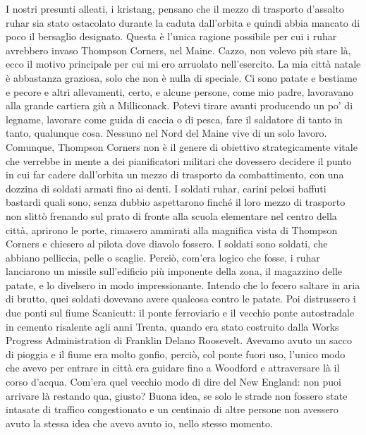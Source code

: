 I nostri presunti alleati, i kristang, pensano che il mezzo di trasporto
d'assalto ruhar sia stato ostacolato durante la caduta dall'orbita e
quindi abbia mancato di poco il bersaglio designato. Questa è l'unica
ragione possibile per cui i ruhar avrebbero invaso Thompson Corners, nel
Maine. Cazzo, non volevo più stare là, ecco il motivo principale per cui
mi ero arruolato nell'esercito. La mia città natale è abbastanza
graziosa, solo che non è nulla di speciale. Ci sono patate e bestiame e
pecore e altri allevamenti, certo, e alcune persone, come mio padre,
lavoravano alla grande cartiera giù a Milliconack. Potevi tirare avanti
producendo un po' di legname, lavorare come guida di caccia o di pesca,
fare il saldatore di tanto in tanto, qualunque cosa. Nessuno nel Nord
del Maine vive di un solo lavoro. Comunque, Thompson Corners non è il
genere di obiettivo strategicamente vitale che verrebbe in mente a dei
pianificatori militari che dovessero decidere il punto in cui far cadere
dall'orbita un mezzo di trasporto da combattimento, con una dozzina di
soldati armati fino ai denti. I soldati ruhar, carini pelosi baffuti
bastardi quali sono, senza dubbio aspettarono finché il loro mezzo di
trasporto non slittò frenando sul prato di fronte alla scuola elementare
nel centro della città, aprirono le porte, rimasero ammirati alla
magnifica vista di Thompson Corners e chiesero al pilota dove diavolo
fossero. I soldati sono soldati, che abbiano pelliccia, pelle o scaglie.
Perciò, com'era logico che fosse, i ruhar lanciarono un missile
sull'edificio più imponente della zona, il magazzino delle patate, e lo
divelsero in modo impressionante. Intendo che lo fecero saltare in aria
di brutto, quei soldati dovevano avere qualcosa contro le patate. Poi
distrussero i due ponti sul fiume Scanicutt: il ponte ferroviario e il
vecchio ponte autostradale in cemento risalente agli anni Trenta, quando
era stato costruito dalla Works Progress Administration di Franklin
Delano Roosevelt. Avevamo avuto un sacco di pioggia e il fiume era molto
gonfio, perciò, col ponte fuori uso, l'unico modo che avevo per entrare
in città era guidare fino a Woodford e attraversare là il corso d'acqua.
Com'era quel vecchio modo di dire del New England: non puoi arrivare là
restando qua, giusto? Buona idea, se solo le strade non fossero state
intasate di traffico congestionato e un centinaio di altre persone non
avessero avuto la stessa idea che avevo avuto io, nello stesso momento.

